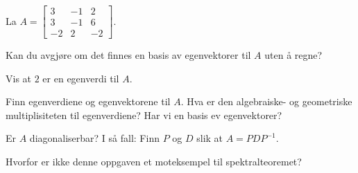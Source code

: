 \begin{oppgave}
La $A=\begin{bmatrix}
3 & -1 & 2\\
3 & -1 & 6\\
-2 & 2 & -2
\end{bmatrix}$. 

\begin{punkt}
Kan du avgjøre om det finnes en basis av egenvektorer til $A$ uten å regne?
\end{punkt}

\begin{punkt}
Vis at $2$ er en egenverdi til $A$.
\end{punkt}


\begin{punkt}
Finn egenverdiene og egenvektorene til $A$. Hva er den algebraiske- og geometriske multiplisiteten til egenverdiene? Har vi en basis ev egenvektorer?
\end{punkt}

\begin{punkt}
Er $A$ diagonaliserbar? I så fall: Finn $P$ og $D$ slik at $A=PDP^{-1}$.
\end{punkt}

\begin{punkt}
Hvorfor er ikke denne oppgaven et moteksempel til spektralteoremet?
\end{punkt}

\end{oppgave}


